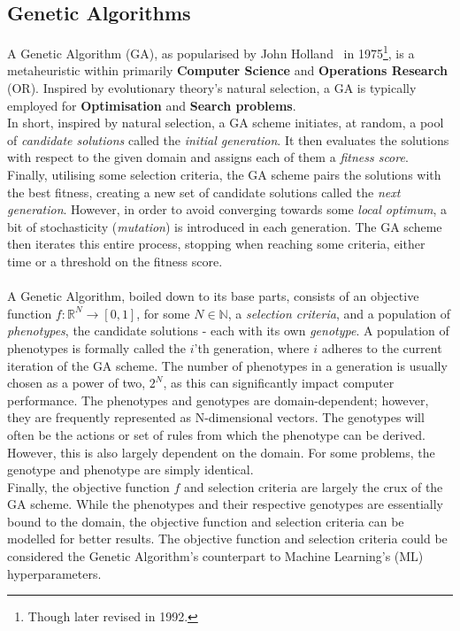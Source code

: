 \subsection{Genetic Algorithms}
A Genetic Algorithm (GA), as popularised by John Holland~\cite{Genetic-Algorithm-original} in 1975\footnote{Though later revised in 1992.}, is a metaheuristic within primarily \textbf{Computer Science} and \textbf{Operations Research} (OR). Inspired by evolutionary theory's natural selection, a GA is typically employed for \textbf{Optimisation} and \textbf{Search problems}.
\\
In short, inspired by natural selection, a GA scheme initiates, at random, a pool of \textit{candidate solutions} called the \textit{initial generation}. It then evaluates the solutions with respect to the given domain and assigns each of them a \textit{fitness score}. Finally, utilising some selection criteria, the GA scheme pairs the solutions with the best fitness, creating a new set of candidate solutions called the \textit{next generation}. However, in order to avoid converging towards some \textit{local optimum}, a bit of stochasticity (\textit{mutation}) is introduced in each generation. The GA scheme then iterates this entire process, stopping when reaching some criteria, either time or a threshold on the fitness score.
\\
\\
A Genetic Algorithm, boiled down to its base parts, consists of an objective function $f : \mathbb{R}^N \rightarrow [0,1]$, for some $N \in \mathbb{N}$, a \textit{selection criteria}, and a population of \textit{phenotypes}, the candidate solutions - each with its own \textit{genotype}. A population of phenotypes is formally called the $i$'th generation, where $i$ adheres to the current iteration of the GA scheme. The number of phenotypes in a generation is usually chosen as a power of two, $2^N$, as this can significantly impact computer performance. The phenotypes and genotypes are domain-dependent; however, they are frequently represented as N-dimensional vectors. The genotypes will often be the actions or set of rules from which the phenotype can be derived. However, this is also largely dependent on the domain. For some problems, the genotype and phenotype are simply identical.
\\
Finally, the objective function $f$ and selection criteria are largely the crux of the GA scheme. While the phenotypes and their respective genotypes are essentially bound to the domain, the objective function and selection criteria can be modelled for better results. The objective function and selection criteria could be considered the Genetic Algorithm's counterpart to Machine Learning's (ML) hyperparameters.
